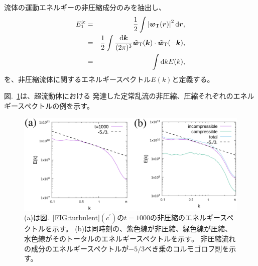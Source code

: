 \documentclass[12pt,a4paper]{jbook}
\begin{document}
		流体の運動エネルギーの非圧縮成分のみを抽出し、
		\begin{eqnarray}
			E_1^{{\rm ic}}
			& = & \frac{1}{2} \int \left|\bm{w}_{{\rm T}}(\bm{r}) \right|^2 {\rm d}\bm{r},
			\\
			& = & \frac{1}{2}\int\frac{{\rm d}{\bm k}}{(2 \pi)^3}
			\tilde{\bm{w}}_{{\rm T}}(\bm{k}) \cdot \tilde{\bm{w}}_{{\rm T}}(-\bm{k}),
			\\
			& = & \int {\rm d}k E(k),
		\end{eqnarray}
		を、非圧縮流体に関するエネルギースペクトル$E(k)$と定義する。	


        図.~\ref{FIG:incompressible}は、超流動体における
        発達した定常乱流の非圧縮、圧縮それぞれのエネルギースペクトルの例を示す。
		\begin{figure}[H]
			\centering
			\includegraphics[width=16cm]{incompressible.eps}
			\caption{
			(a)は図.~\ref{FIG:turbulent}$(c^{\prime})$の$t=1000$の非圧縮のエネルギースペクトルを示す。
            (b)は同時刻の、紫色線が非圧縮、緑色線が圧縮、水色線がそのトータルのエネルギースペクトルを示す。
            非圧縮流れの成分のエネルギースペクトルが$-5/3$べき乗のコルモゴロフ則を示す。
			}
			\label{FIG:incompressible}
		\end{figure}
\end{document}
